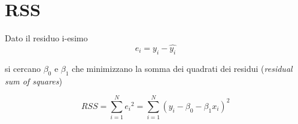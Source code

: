 \section{RSS}

Dato il residuo i-esimo
\begin{equation}
e_i = y_i - \hat{y_i}
\end{equation}

si cercano ${\beta}_0$ e ${\beta}_1$ che minimizzano la somma dei quadrati dei residui (\textit{residual sum of squares})

\begin{equation}
RSS =  \sum_{i=1}^N {e_i}^2 = \sum_{i=1}^N (y_i - {\beta}_0 - {\beta_1}x_i)^2
\end{equation}